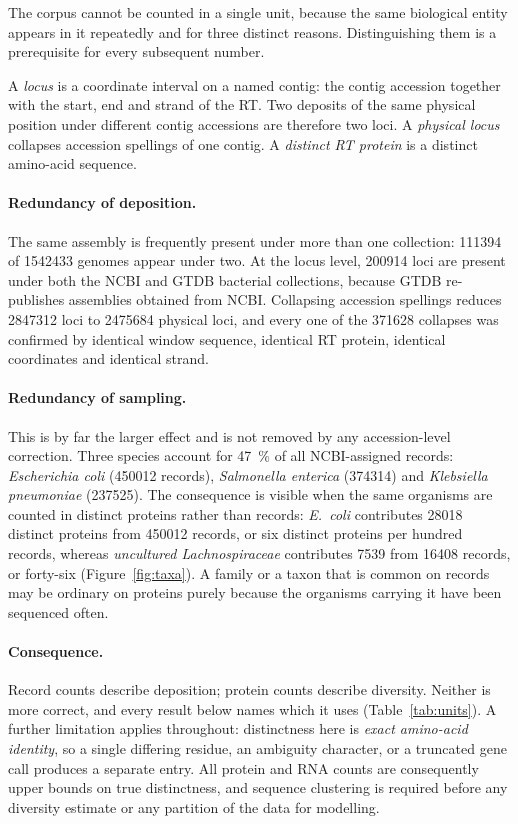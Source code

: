 The corpus cannot be counted in a single unit, because the same biological entity appears in it
repeatedly and for three distinct reasons. Distinguishing them is a prerequisite for every
subsequent number.

A \emph{locus} is a coordinate interval on a named contig: the contig accession together with the
start, end and strand of the RT. Two deposits of the same physical position under different contig
accessions are therefore two loci. A \emph{physical locus} collapses accession spellings of one
contig. A \emph{distinct RT protein} is a distinct amino-acid sequence.

\paragraph{Redundancy of deposition.} The same assembly is frequently present under more than one
collection: \num{111394} of \num{1542433} genomes appear under two. At the locus level,
\num{200914} loci are present under both the NCBI and GTDB bacterial collections, because GTDB
re-publishes assemblies obtained from NCBI. Collapsing accession spellings reduces \num{2847312}
loci to \num{2475684} physical loci, and every one of the \num{371628} collapses was confirmed by
identical window sequence, identical RT protein, identical coordinates and identical strand.

\paragraph{Redundancy of sampling.} This is by far the larger effect and is not removed by any
accession-level correction. Three species account for \SI{47}{\percent} of all NCBI-assigned
records: \emph{Escherichia coli} (\num{450012} records), \emph{Salmonella enterica}
(\num{374314}) and \emph{Klebsiella pneumoniae} (\num{237525}). The consequence is visible when the
same organisms are counted in distinct proteins rather than records: \emph{E.\ coli} contributes
\num{28018} distinct proteins from \num{450012} records, or six distinct proteins per hundred
records, whereas \emph{uncultured Lachnospiraceae} contributes \num{7539} from \num{16408}
records, or forty-six (Figure~\ref{fig:taxa}). A family or a taxon that is common on records may be
ordinary on proteins purely because the organisms carrying it have been sequenced often.

\paragraph{Consequence.} Record counts describe deposition; protein counts describe diversity.
Neither is more correct, and every result below names which it uses (Table~\ref{tab:units}). A
further limitation applies throughout: distinctness here is \emph{exact amino-acid identity}, so a
single differing residue, an ambiguity character, or a truncated gene call produces a separate
entry. All protein and RNA counts are consequently upper bounds on true distinctness, and sequence
clustering is required before any diversity estimate or any partition of the data for modelling.

